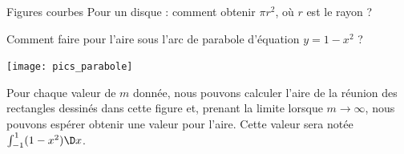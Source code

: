 \begin{frame}{Figures courbes}
Pour un disque : comment obtenir $\pi r^2$, où \(r\) est le rayon ?\pause{}

Comment faire pour l'aire sous l'arc de parabole d'équation \(y = 1 - x^{2}\) ?\pause{} 
\begin{center}
\texttt{[image: pics\_parabole]}




\end{center}
Pour chaque valeur de \(m\) donnée, nous pouvons calculer l'aire de la réunion des rectangles dessinés dans cette figure\pause{} et, prenant la limite lorsque \(m \to \infty\), nous pouvons espérer obtenir une valeur pour l'aire.\pause{} Cette valeur sera notée \(\int_{-1}^{1} (1 - x^{2}) \D x\).\pause{}
\end{frame}

